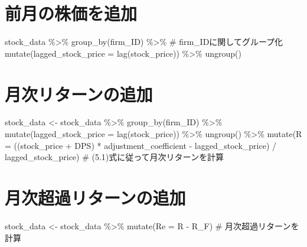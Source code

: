 \documentclass[
  letterpaper,
  DIV=11,
  numbers=noendperiod]{scrreprt}
\newenvironment{Shaded}{\begin{snugshade}}{\end{snugshade}}
\newcommand{\AttributeTok}[1]{\textcolor[rgb]{0.40,0.45,0.13}{#1}}
\newcommand{\CommentTok}[1]{\textcolor[rgb]{0.37,0.37,0.37}{#1}}
\newcommand{\FunctionTok}[1]{\textcolor[rgb]{0.28,0.35,0.67}{#1}}
\newcommand{\NormalTok}[1]{\textcolor[rgb]{0.00,0.23,0.31}{#1}}
\newcommand{\OtherTok}[1]{\textcolor[rgb]{0.00,0.23,0.31}{#1}}
\newcommand{\SpecialCharTok}[1]{\textcolor[rgb]{0.37,0.37,0.37}{#1}}
\begin{document}
\section{前月の株価を追加}\label{ux524dux6708ux306eux682aux4fa1ux3092ux8ffdux52a0}

\begin{Shaded}
\begin{Highlighting}[]
\NormalTok{stock\_data }\SpecialCharTok{\%\textgreater{}\%} 
  \FunctionTok{group\_by}\NormalTok{(firm\_ID) }\SpecialCharTok{\%\textgreater{}\%} \CommentTok{\# firm\_IDに関してグループ化}
  \FunctionTok{mutate}\NormalTok{(}\AttributeTok{lagged\_stock\_price =} \FunctionTok{lag}\NormalTok{(stock\_price)) }\SpecialCharTok{\%\textgreater{}\%} 
  \FunctionTok{ungroup}\NormalTok{()}
\end{Highlighting}
\end{Shaded}

\section{月次リターンの追加}\label{ux6708ux6b21ux30eaux30bfux30fcux30f3ux306eux8ffdux52a0}

\begin{Shaded}
\begin{Highlighting}[]
\NormalTok{stock\_data }\OtherTok{\textless{}{-}}\NormalTok{ stock\_data }\SpecialCharTok{\%\textgreater{}\%} 
  \FunctionTok{group\_by}\NormalTok{(firm\_ID) }\SpecialCharTok{\%\textgreater{}\%} 
  \FunctionTok{mutate}\NormalTok{(}\AttributeTok{lagged\_stock\_price =} \FunctionTok{lag}\NormalTok{(stock\_price)) }\SpecialCharTok{\%\textgreater{}\%} 
  \FunctionTok{ungroup}\NormalTok{() }\SpecialCharTok{\%\textgreater{}\%} 
  \FunctionTok{mutate}\NormalTok{(}\AttributeTok{R =}\NormalTok{ ((stock\_price }\SpecialCharTok{+}\NormalTok{ DPS) }\SpecialCharTok{*}\NormalTok{ adjustment\_coefficient }\SpecialCharTok{{-}}\NormalTok{ lagged\_stock\_price) }\SpecialCharTok{/}\NormalTok{ lagged\_stock\_price) }\CommentTok{\# (5.1)式に従って月次リターンを計算}
\end{Highlighting}
\end{Shaded}

\section{月次超過リターンの追加}\label{ux6708ux6b21ux8d85ux904eux30eaux30bfux30fcux30f3ux306eux8ffdux52a0}

\begin{Shaded}
\begin{Highlighting}[]
\NormalTok{stock\_data }\OtherTok{\textless{}{-}}\NormalTok{ stock\_data }\SpecialCharTok{\%\textgreater{}\%}
  \FunctionTok{mutate}\NormalTok{(}\AttributeTok{Re =}\NormalTok{ R }\SpecialCharTok{{-}}\NormalTok{ R\_F) }\CommentTok{\# 月次超過リターンを計算}
\end{Highlighting}
\end{Shaded}
\end{document}
